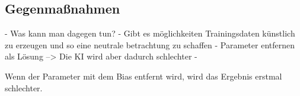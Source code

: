 \begin{onehalfspace}
        \subsection{Gegenma{\ss}nahmen}
        \label{subsubsec:gegenmassnahmen}
            - Was kann man dagegen tun?
            - Gibt es möglichkeiten Trainingsdaten künstlich zu erzeugen und so eine neutrale betrachtung zu schaffen
            - Parameter entfernen als Lösung --> Die KI wird aber dadurch schlechter 
            - 

            Wenn der Parameter mit dem Bias entfernt wird, wird das Ergebnis erstmal schlechter. 
            
    \newpage
    \end{onehalfspace}